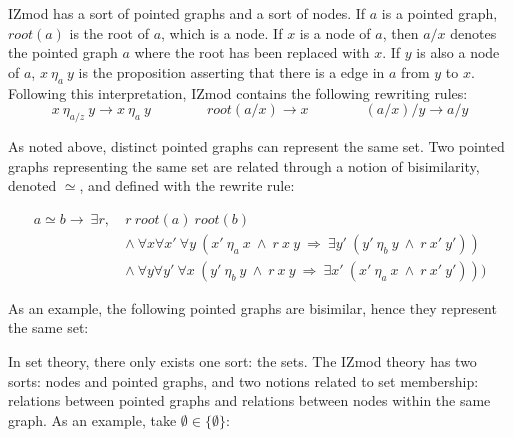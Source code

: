 \documentclass[submission,copyright,creativecommons]{eptcs}
\def\lra{\longrightarrow}
\def\imp{\mathbin{\Rightarrow}}
\def\fa{{\forall}}
\def\conj{\mathbin{\wedge}}
\def\ex{{\exists}}
\begin{document}
IZmod has a sort of pointed graphs and a sort of nodes. If $a$ is a pointed graph, $root(a)$ is the root of $a$, which is a node. If $x$ is a node of $a$, then $a/x$ denotes the pointed graph $a$ where the root has been replaced with $x$. If $y$ is also a node of $a$, $x~\eta_a~y$ is the proposition asserting that there is a edge in $a$ from $y$ to $x$. Following this interpretation, IZmod contains the following rewriting rules:
$$ x \ \eta_{a/z} \ y \longrightarrow x \ \eta_a \ y \qquad\qquad root(a/x) \longrightarrow x \qquad\qquad (a/x)/y \longrightarrow a/y $$

As noted above, distinct pointed graphs can represent the same set. Two pointed graphs representing the same set are related through a notion of bisimilarity, denoted $\simeq$, and defined with the rewrite rule:

\begin{equation*}
\begin{split}
a \simeq b \lra~\ex r,~ &r~root(a)~root(b) \\
&\conj \ \fa x \fa x'~\fa y~(x'~\eta_a~x~\conj~r~x~y~\imp~\ex y'~(y'~\eta_b~y~\conj~r~x'~y')) \\
&\conj \ \fa y \fa y'~\fa x~(y'~\eta_b~y~\conj~r~x~y~\imp~\ex x'~(x'~\eta_a~x~\conj~r~x'~y')))
\end{split}
\end{equation*}

As an example, the following pointed graphs are bisimilar, hence they represent the same set:

\begin{figure}[h]
\centering
{}
\end{figure}

In set theory, there only exists one sort: the sets. The IZmod theory has two sorts: nodes and pointed graphs, and two notions related to set membership: relations between pointed graphs and relations between nodes within the same graph. As an example, take $\emptyset \in \{\emptyset\}$:
\end{document}
